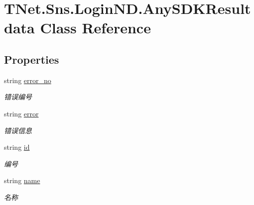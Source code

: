 \hypertarget{class_t_net_1_1_sns_1_1_login_n_d_1_1_any_s_d_k_resultdata}{}\section{T\+Net.\+Sns.\+Login\+N\+D.\+Any\+S\+D\+K\+Resultdata Class Reference}
\label{class_t_net_1_1_sns_1_1_login_n_d_1_1_any_s_d_k_resultdata}


 


\subsection*{Properties}
\begin{DoxyCompactItemize}
\item 
string \mbox{\hyperlink{class_t_net_1_1_sns_1_1_login_n_d_1_1_any_s_d_k_resultdata_a3871dbe4eb456f799cad8fa25d122643}{error\+\_\+no}}
\begin{DoxyCompactList}\small\item\em 错误编号 \end{DoxyCompactList}\item 
string \mbox{\hyperlink{class_t_net_1_1_sns_1_1_login_n_d_1_1_any_s_d_k_resultdata_a22118e900a2bba28e859f8a6ed7b20d7}{error}}
\begin{DoxyCompactList}\small\item\em 错误信息 \end{DoxyCompactList}\item 
string \mbox{\hyperlink{class_t_net_1_1_sns_1_1_login_n_d_1_1_any_s_d_k_resultdata_ad85969d0d475154c4ee8cdecb0767a20}{id}}
\begin{DoxyCompactList}\small\item\em 编号 \end{DoxyCompactList}\item 
string \mbox{\hyperlink{class_t_net_1_1_sns_1_1_login_n_d_1_1_any_s_d_k_resultdata_ac7a1a8d867515235ebb5440f76543912}{name}}
\begin{DoxyCompactList}\small\item\em 名称 \end{DoxyCompactList}\item 

\end{DoxyCompactItemize}

